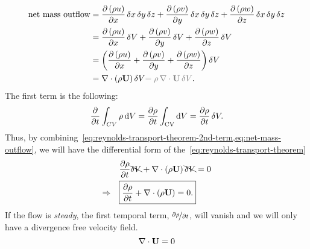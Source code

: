 %
\begin{equation}
	\begin{aligned}
		\text{net mass outflow} & = \f{\p \left(\rho u\right)}{\p x} \deltaop x \deltaop y \deltaop z
		+ \f{\p \left(\rho v\right)}{\p y} \deltaop x \deltaop y \deltaop z
		+ \f{\p \left(\rho w\right)}{\p z} \deltaop x \deltaop y \deltaop z                                                             \\
		                        & = \f{\p \left(\rho u\right)}{\p x} \deltaop V
		+ \f{\p \left(\rho v\right)}{\p y} \deltaop V
		+ \f{\p \left(\rho w\right)}{\p z} \deltaop V                                                                               \\
		                        & = \left(\f{\p \left(\rho u\right)}{\p x}
		+ \f{\p \left(\rho v\right)}{\p y}
		+ \f{\p \left(\rho w\right)}{\p z}\right) \deltaop V                                                                        \\
		                        & = \grad \cdot \left(\rho \U\right) \deltaop V \textcolor{gray}{= \rho \grad \cdot \U \deltaop V}.
	\end{aligned}
	\label{eq:net-mass-outflow}
\end{equation}
%
The first term is the following:
%
\begin{equation}
	\begin{aligned}
		\frac{\partial}{\partial t} \int_{CV}{\rho \mathop{}\!\mathrm{d} V} = \frac{\partial \rho}{\partial t} \int_{\text{CV}}{\mathop{}\!\mathrm{d} V} = \frac{\partial \rho}{\partial t} \mathop{}\!\delta V.
	\end{aligned}
	\label{eq:reynolds-transport-theorem-2nd-term}
\end{equation}
%
Thus, by combining~\cref{eq:reynolds-transport-theorem-2nd-term,eq:net-mass-outflow}, we will have the differential form of the~\cref{eq:reynolds-transport-theorem}
%
\begin{equation}
	\begin{aligned}
		\quad          & \frac{\partial \rho}{\partial t} \bcancel{\mathop{}\!\delta V} +  \mathop{}\!\nabla \cdot \left(\rho \mathbf{U}\right) \bcancel{\mathop{}\!\delta V} = 0 \\
		\Rightarrow \quad & \boxed{\frac{\partial \rho}{\partial t} +  \mathop{}\!\nabla \cdot \left(\rho \mathbf{U}\right) = 0.}
	\end{aligned}
	\label{eq:continuity-equation-differential-form}
\end{equation}
%
If the flow is \emph{steady}, the first temporal term, \(\nicefrac{\partial \rho}{\partial t}\), will vanish and we will only have a divergence free velocity field.
%
\begin{equation}
	\mathop{}\!\nabla \cdot \mathbf{U} = 0
	\label{eq:continuity-equation-steady-state}
\end{equation}



